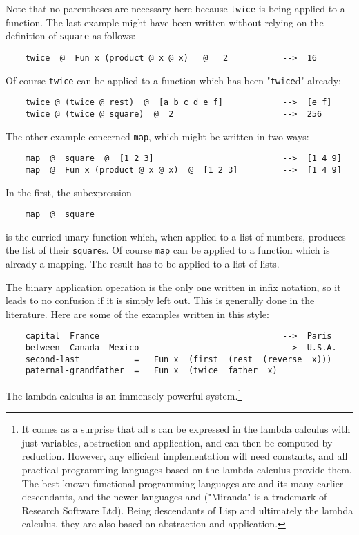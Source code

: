 Note that no parentheses are necessary here because
\verb#twice# is being applied to a function.
The last example might have been written without relying
on the definition of \verb#square# as follows:
\begin{verbatim}
    twice  @  Fun x (product @ x @ x)   @   2           -->  16
\end{verbatim}
Of course \verb#twice# can be applied to a function
which has been "\verb#twice#d" already:
\begin{verbatim}
    twice @ (twice @ rest)  @  [a b c d e f]            -->  [e f]
    twice @ (twice @ square)  @  2                      -->  256
\end{verbatim}
\par
The other example concerned \verb#map#,
which might be written in two ways:
\begin{verbatim}
    map  @  square  @  [1 2 3]                          -->  [1 4 9]
    map  @  Fun x (product @ x @ x)  @  [1 2 3]         -->  [1 4 9]
\end{verbatim}
In the first, the subexpression
\begin{verbatim}
    map  @  square
\end{verbatim}
is the curried unary function which,
when applied to a list of numbers,
produces the list of their \verb#square#s.
Of course \verb#map# can be applied to a function which is already
a mapping.
The result has to be applied to a list of lists.
\par
The binary application operation is the only one written in infix notation,
so it leads to no confusion if it is simply left out.
This is generally done in the literature.
Here are some of the examples written in this style:
\begin{verbatim}
    capital  France                                     -->  Paris
    between  Canada  Mexico                             -->  U.S.A.
    second-last           =   Fun x  (first  (rest  (reverse  x)))
    paternal-grandfather  =   Fun x  (twice  father  x)
\end{verbatim}
\par
The lambda calculus is an immensely powerful system.\footnote{
It comes as a surprise that all s
can be expressed in the lambda calculus with just variables, abstraction
and application, and can then be computed by reduction.
However,
any efficient implementation will need constants,
and all practical programming languages based
on the lambda calculus provide them.
The best known functional programming languages are
 and its many earlier descendants,
and the newer languages  and
 {\tiny ("Miranda" is a trademark of Research Software Ltd)}.
Being descendants of Lisp and ultimately the lambda calculus,
they are also based on abstraction and application.
}
